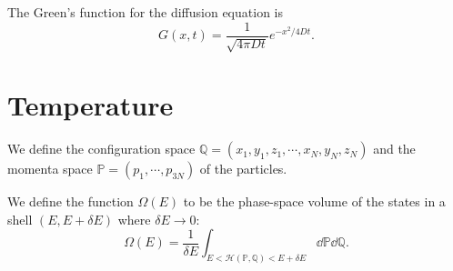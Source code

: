 \documentclass{article}
\begin{document}
The Green's function for the diffusion equation is 
\begin{equation}
    G(x,t)=\frac 1{\sqrt{4\pi Dt}}e^{-x^2/4Dt}.
\end{equation}

\section{Temperature}

We define the configuration space $\mathbb Q=(x_1,y_1,z_1,\cdots,x_N,y_N,z_N)$ and the momenta space $\mathbb P=(p_1,\cdots,p_{3N})$ of the particles. 

We define the function $\Omega(E)$ to be the phase-space volume of the states in a shell $(E,E+\delta E)$ where $\delta E\to 0$:
\begin{equation}
    \Omega(E)=\frac{1}{\delta E}\int_{E<\mathcal H(\mathbb P,\mathbb Q)<E+\delta E}\dd\mathbb P\dd\mathbb Q.
\end{equation}
\end{document}
